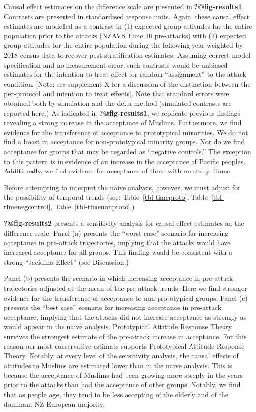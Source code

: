 \documentclass[
  singlecolumn]{report}
\begin{document}
Causal effect estimates on the difference scale are presented in
\textbf{?@fig-results1}. Contrasts are presented in standardised
response units. Again, these causal effect estimates are modelled as a
contrast in (1) expected group attitudes for the entire population prior
to the attacks (NZAVS Time 10 pre-attacks) with (2) expected group
attitudes for the entire population during the following year weighted
by 2018 census data to recover post-stratification estimates. Assuming
correct model specification and no measurement error, such contrasts
would be unbiased estimates for the intention-to-treat effect for random
``assignment'' to the attack condition. {[}Note: see supplement X for a
discussion of the distinction between the per-protocol and intention to
treat effects{]}. Note that standard errors were obtained both by
simulation and the delta method (simulated contrasts are reported here.)
As indicated in \textbf{?@fig-results1}, we replicate previous findings
revealing a strong increase in the acceptance of Muslims. Furthermore,
we find evidence for the transference of acceptance to prototypical
minorities. We do not find a boost in acceptance for non-prototypical
minority groups. Nor do we find acceptance for groups that may be
regarded as ``negative controls.'' The exception to this pattern is in
evidence of an increase in the acceptance of Pacific peoples.
Additionally, we find evidence for acceptance of those with mentally
illness.

Before attempting to interpret the naive analysis, however, we must
adjust for the possibility of temporal trends (see:
Table~\ref{tbl-timeproto}, Table~\ref{tbl-timenegcontrol},
Table~\ref{tbl-timenonproto}.)

\textbf{?@fig-results2} presents a sensitivity analysis for causal
effect estimates on the difference scale. Panel (a) presents the ``worst
case'' scenario for increasing acceptance in pre-attack trajectories,
implying that the attacks would have increased acceptance for all
groups. This finding would be consistent with a strong ``Jacidina
Effect'' (see Discussion.)

Panel (b) presents the scenario in which increasing acceptance in
pre-attack trajectories adjusted at the mean of the pre-attack trends.
Here we find stronger evidence for the transference of acceptance to
non-prototypical groups. Panel (c) presents the ``best case'' scenario
for increasing acceptance in pre-attack acceptance, implying that the
attacks did not increase acceptance as strongly as would appear in the
naive analysis. Prototypical Attitude Response Theory survives the
strongest estimate of the pre-attack increase in acceptance. For this
reason our most conservative estimats supports Prototypical Attitude
Response Theory. Notably, at every level of the sensitivity analysis,
the causal effects of attitudes to Muslims are estimated lower than in
the naive analysis. This is because the acceptance of Muslims had been
growing more steeply in the years prior to the attacks than had the
acceptance of other groups. Notably, we find that as people age, they
tend to be less accepting of the elderly and of the dominant NZ European
majority.
\end{document}
